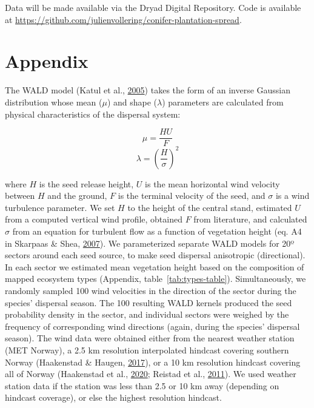 \documentclass[
]{article}
\begin{document}
Data will be made available via the Dryad Digital Repository. Code is available at \url{https://github.com/julienvollering/conifer-plantation-spread}.

\newpage

\hypertarget{appendix}{%
\section{Appendix}\label{appendix}}

The WALD model (Katul et al., \protect\hyperlink{ref-katulMechanisticAnalyticalModels2005}{2005}) takes the form of an inverse Gaussian distribution whose mean (\(\mu\)) and shape (\(\lambda\)) parameters are calculated from physical characteristics of the dispersal system:

\begin{equation}
\mu = \frac{HU}{F}
\end{equation}
\begin{equation}
\lambda = \left(\frac{H}{\sigma}\right)^2
\end{equation}

where \(H\) is the seed release height, \(U\) is the mean horizontal wind velocity between \(H\) and the ground, \(F\) is the terminal velocity of the seed, and \(\sigma\) is a wind turbulence parameter.
We set \(H\) to the height of the central stand, estimated \(U\) from a computed vertical wind profile, obtained \(F\) from literature, and calculated \(\sigma\) from an equation for turbulent flow as a function of vegetation height (eq. A4 in Skarpaas \& Shea, \protect\hyperlink{ref-skarpaasDispersalPatternsDispersal2007}{2007}).
We parameterized separate WALD models for 20º sectors around each seed source, to make seed dispersal anisotropic (directional).
In each sector we estimated mean vegetation height based on the composition of mapped ecosystem types (Appendix, table~\ref{tab:types-table}).
Simultaneously, we randomly sampled 100 wind velocities in the direction of the sector during the species' dispersal season.
The 100 resulting WALD kernels produced the seed probability density in the sector, and individual sectors were weighed by the frequency of corresponding wind directions (again, during the species' dispersal season).
The wind data were obtained either from the nearest weather station (MET Norway), a 2.5 km resolution interpolated hindcast covering southern Norway (Haakenstad \& Haugen, \protect\hyperlink{ref-haakenstad15yearHighResolution2017}{2017}), or a 10 km resolution hindcast covering all of Norway (Haakenstad et al., \protect\hyperlink{ref-haakenstadNORA10EIRevisedRegional2020}{2020}; Reistad et al., \protect\hyperlink{ref-reistadHighresolutionHindcastWind2011}{2011}). We used weather station data if the station was less than 2.5 or 10 km away (depending on hindcast coverage), or else the highest resolution hindcast.
\end{document}
